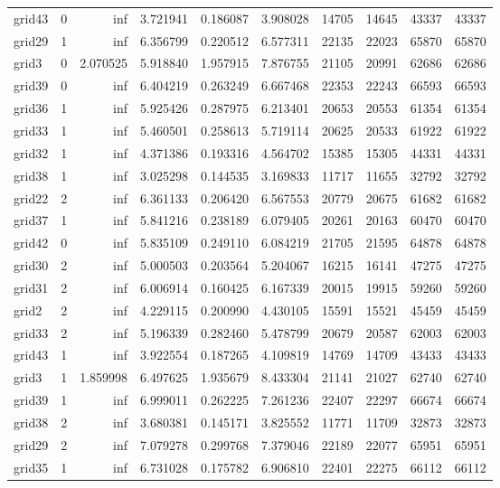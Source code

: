 \begin{longtable}{|l|r|r|r|r|r|r|r|r|r|}
grid43 & 0 & inf & 3.721941 & 0.186087 & 3.908028 & 14705 & 14645 & 43337 & 43337 \\
grid29 & 1 & inf & 6.356799 & 0.220512 & 6.577311 & 22135 & 22023 & 65870 & 65870 \\
grid3 & 0 & 2.070525 & 5.918840 & 1.957915 & 7.876755 & 21105 & 20991 & 62686 & 62686 \\
grid39 & 0 & inf & 6.404219 & 0.263249 & 6.667468 & 22353 & 22243 & 66593 & 66593 \\
grid36 & 1 & inf & 5.925426 & 0.287975 & 6.213401 & 20653 & 20553 & 61354 & 61354 \\
grid33 & 1 & inf & 5.460501 & 0.258613 & 5.719114 & 20625 & 20533 & 61922 & 61922 \\
grid32 & 1 & inf & 4.371386 & 0.193316 & 4.564702 & 15385 & 15305 & 44331 & 44331 \\
grid38 & 1 & inf & 3.025298 & 0.144535 & 3.169833 & 11717 & 11655 & 32792 & 32792 \\
grid22 & 2 & inf & 6.361133 & 0.206420 & 6.567553 & 20779 & 20675 & 61682 & 61682 \\
grid37 & 1 & inf & 5.841216 & 0.238189 & 6.079405 & 20261 & 20163 & 60470 & 60470 \\
grid42 & 0 & inf & 5.835109 & 0.249110 & 6.084219 & 21705 & 21595 & 64878 & 64878 \\
grid30 & 2 & inf & 5.000503 & 0.203564 & 5.204067 & 16215 & 16141 & 47275 & 47275 \\
grid31 & 2 & inf & 6.006914 & 0.160425 & 6.167339 & 20015 & 19915 & 59260 & 59260 \\
grid2 & 2 & inf & 4.229115 & 0.200990 & 4.430105 & 15591 & 15521 & 45459 & 45459 \\
grid33 & 2 & inf & 5.196339 & 0.282460 & 5.478799 & 20679 & 20587 & 62003 & 62003 \\
grid43 & 1 & inf & 3.922554 & 0.187265 & 4.109819 & 14769 & 14709 & 43433 & 43433 \\
grid3 & 1 & 1.859998 & 6.497625 & 1.935679 & 8.433304 & 21141 & 21027 & 62740 & 62740 \\
grid39 & 1 & inf & 6.999011 & 0.262225 & 7.261236 & 22407 & 22297 & 66674 & 66674 \\
grid38 & 2 & inf & 3.680381 & 0.145171 & 3.825552 & 11771 & 11709 & 32873 & 32873 \\
grid29 & 2 & inf & 7.079278 & 0.299768 & 7.379046 & 22189 & 22077 & 65951 & 65951 \\
grid35 & 1 & inf & 6.731028 & 0.175782 & 6.906810 & 22401 & 22275 & 66112 & 66112 \\

\end{longtable}
